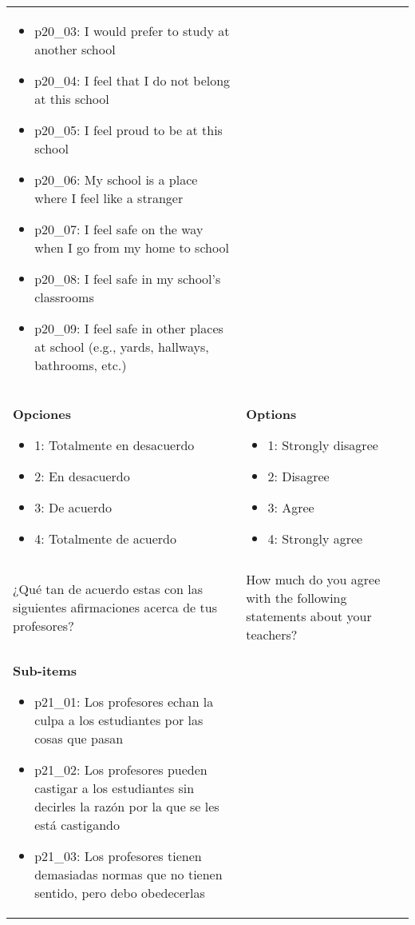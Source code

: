 \documentclass[11pt]{article}
\begin{document}
\begin{longtable}{@{}LL@{}}
\begin{itemize}[leftmargin=*]
\item p20\_03: I would prefer to study at another school
\item p20\_04: I feel that I do not belong at this school
\item p20\_05: I feel proud to be at this school
\item p20\_06: My school is a place where I feel like a stranger
\item p20\_07: I feel safe on the way when I go from my home to school
\item p20\_08: I feel safe in my school's classrooms
\item p20\_09: I feel safe in other places at school (e.g., yards, hallways, bathrooms, etc.)\end{itemize} \\
\textbf{Opciones}\par\begin{itemize}[leftmargin=*]\item 1: Totalmente en desacuerdo
\item 2: En desacuerdo
\item 3: De acuerdo
\item 4: Totalmente de acuerdo\end{itemize} & \textbf{Options}\par\begin{itemize}[leftmargin=*]\item 1: Strongly disagree
\item 2: Disagree
\item 3: Agree
\item 4: Strongly agree\end{itemize} \\
\addlinespace[4pt]
 \\ 
¿Qué tan de acuerdo estas con las siguientes afirmaciones acerca de tus profesores? & How much do you agree with the following statements about your teachers? \\
\textbf{Sub-items}\par\begin{itemize}[leftmargin=*]\item p21\_01: Los profesores echan la culpa a los estudiantes por las cosas que pasan
\item p21\_02: Los profesores pueden castigar a los estudiantes sin decirles la razón por la que se les está castigando
\item p21\_03: Los profesores tienen demasiadas normas que no tienen sentido, pero debo obedecerlas

\end{itemize}
\end{longtable}
\end{document}
